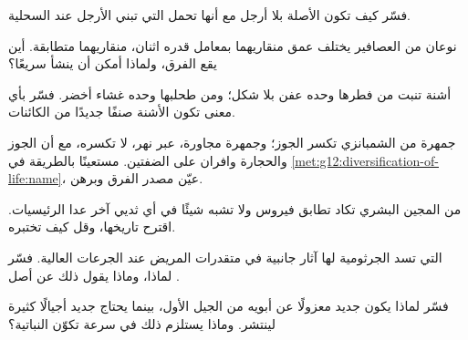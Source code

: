 \begin{exercise}[$\star\star$]\label{exo:g12:diversification-of-life:8}
فسّر كيف تكون الأصلة بلا أرجل مع أنها تحمل  التي تبني الأرجل
عند السحلية.
\end{exercise}

\begin{exercise}[$\star\star$]\label{exo:g12:diversification-of-life:9}
نوعان من العصافير يختلف عمق منقاريهما بمعامل قدره اثنان، 
منقاريهما متطابقة. أين يقع الفرق، ولماذا أمكن أن ينشأ سريعًا؟
\end{exercise}

\begin{exercise}[$\star\star$]\label{exo:g12:diversification-of-life:10}
أشنة تنبت من فطرها وحده عفن بلا شكل؛ ومن طحلبها وحده غشاء أخضر. فسّر
بأي معنى تكون الأشنة صنفًا جديدًا من الكائنات.
\end{exercise}

\begin{exercise}[$\star\star$]\label{exo:g12:diversification-of-life:11}
جمهرة من الشمبانزي تكسر الجوز؛ وجمهرة مجاورة، عبر نهر، لا تكسره، مع
أن الجوز والحجارة وافران على الضفتين. مستعينًا بالطريقة في
\cref{met:g12:diversification-of-life:name}، عيّن مصدر الفرق وبرهن.
\end{exercise}

\begin{exercise}[$\star\star\star$]\label{exo:g12:diversification-of-life:12}
 من المجين البشري تكاد تطابق  فيروس ولا تشبه شيئًا في أي
ثديي آخر عدا الرئيسيات. اقترح تاريخها، وقل كيف تختبره.
\end{exercise}

\begin{exercise}[$\star\star\star$]\label{exo:g12:diversification-of-life:13}
 التي تسد  الجرثومية لها آثار جانبية في
متقدرات المريض عند الجرعات العالية. فسّر لماذا، وماذا يقول ذلك عن أصل
.
\end{exercise}

\begin{exercise}[$\star\star\star$]\label{exo:g12:diversification-of-life:14}
فسّر لماذا يكون   جديد معزولًا عن أبويه من الجيل
الأول، بينما يحتاج  جديد أجيالًا كثيرة لينتشر. وماذا يستلزم ذلك في
سرعة تكوّن  النباتية؟
\end{exercise}

